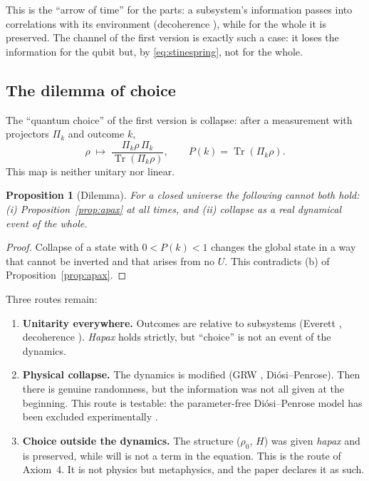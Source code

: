 \documentclass[a4paper,11pt]{article}
\newtheorem{prop}{Proposition}
\theoremstyle{definition}
\newcommand{\Tr}{\operatorname{Tr}}
\begin{document}
This is the ``arrow of time'' for the parts: a subsystem's information passes into correlations with its environment (decoherence \cite{zurek}), while for the whole it is preserved. The channel of the first version is exactly such a case: it loses the information for the qubit but, by \eqref{eq:stinespring}, not for the whole.

\subsection{The dilemma of choice}\label{sec:choice}

The ``quantum choice'' of the first version is collapse: after a measurement with projectors $\Pi_k$ and outcome $k$,
\begin{equation}
\rho\;\mapsto\;\frac{\Pi_k\rho\,\Pi_k}{\Tr(\Pi_k\rho)},\qquad P(k)=\Tr(\Pi_k\rho).
\end{equation}
This map is neither unitary nor linear.

\begin{prop}[Dilemma]\label{prop:dilemma}
For a closed universe the following cannot both hold: (i) Proposition~\ref{prop:apax} at all times, and (ii) collapse as a real dynamical event of the whole.
\end{prop}
\begin{proof}
Collapse of a state with $0<P(k)<1$ changes the global state in a way that cannot be inverted and that arises from no $U$. This contradicts (b) of Proposition~\ref{prop:apax}.
\end{proof}

Three routes remain:
\begin{enumerate}
\item \textbf{Unitarity everywhere.} Outcomes are relative to subsystems (Everett \cite{everett}, decoherence \cite{zurek}). \emph{Hapax} holds strictly, but ``choice'' is not an event of the dynamics.
\item \textbf{Physical collapse.} The dynamics is modified (GRW \cite{grw}, Diósi–Penrose). Then there is genuine randomness, but the information was not all given at the beginning. This route is testable: the parameter-free Diósi–Penrose model has been excluded experimentally \cite{donadi}.
\item \textbf{Choice outside the dynamics.} The structure ($\rho_0$, $H$) was given \emph{hapax} and is preserved, while will is not a term in the equation. This is the route of Axiom~4. It is not physics but metaphysics, and the paper declares it as such.
\end{enumerate}
\end{document}
